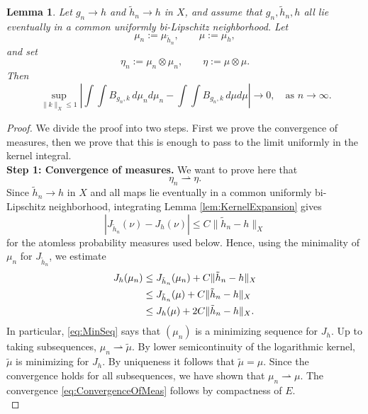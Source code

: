 \documentclass[10pt,a4paper]{amsart}
\newtheorem{lemma}{Lemma}
\begin{document}
    \begin{lemma}
    \label{lem:MovingConvergence}
    Let $g_n\to h$ and $\tilde h_n\to h$ in $X$, and assume that $g_n,\tilde h_n,h$ all lie eventually in a common uniformly bi-Lipschitz neighborhood. Let
    \[
        \mu_n:=\mu_{\tilde h_n},\qquad \mu:=\mu_h,
    \]
    and set
    \[
        \eta_n:=\mu_n\otimes\mu_n,\qquad \eta:=\mu\otimes\mu.
    \]
    Then
    \begin{equation*}
        \sup_{\|k\|_X\leq 1}
        \left|
            \int\int B_{g_n,k}\,d\mu_n d\mu_n
            -
            \int\int B_{g_n,k}\,d\mu d\mu
        \right|
        \to 0,\quad \text{as }n \to \infty.
    \end{equation*}
\end{lemma}

\begin{proof}
    We divide the proof into two steps. First we prove the convergence of measures, then we prove that this is enough to pass to the limit uniformly in the kernel integral.\\
    \textbf{Step 1: Convergence of measures.} We want to prove here that
    \begin{equation}
        \label{eq:ConvergenceOfMeas}
        \eta_n \rightharpoonup \eta.
    \end{equation}
    Since $\tilde h_n\to h$ in $X$ and all maps lie eventually in a common uniformly bi-Lipschitz neighborhood, integrating Lemma \ref{lem:KernelExpansion} gives
    \begin{equation}
        \label{eq:JBound}
        |J_{\tilde h_n}(\nu)-J_h(\nu)|
        \leq C\|\tilde h_n-h\|_X
    \end{equation}
    for the atomless probability measures used below. Hence, using the minimality of $\mu_n$ for $J_{\tilde h_n}$, we estimate
    \begin{align}
        \label{eq:MinSeq}
        J_h(\mu_n)
        &\leq J_{\tilde h_n}(\mu_n)+C\|\tilde h_n-h\|_X  \notag\\
        &\leq J_{\tilde h_n}(\mu)+C\|\tilde h_n-h\|_X \notag\\
        &\leq J_h(\mu)+2C\|\tilde h_n-h\|_X .
    \end{align}
    In particular, \eqref{eq:MinSeq} says that $(\mu_n)$ is a minimizing sequence for $J_h$. Up to taking subsequences, $\mu_n\rightharpoonup \tilde\mu$. By lower semicontinuity of the logarithmic kernel, $\tilde\mu$ is minimizing for $J_h$. By uniqueness it follows that $\tilde\mu=\mu$. Since the convergence holds for all subsequences, we have shown that $\mu_n\rightharpoonup\mu$. The convergence \eqref{eq:ConvergenceOfMeas} follows by compactness of $E$.\\

\end{proof}
\end{document}
